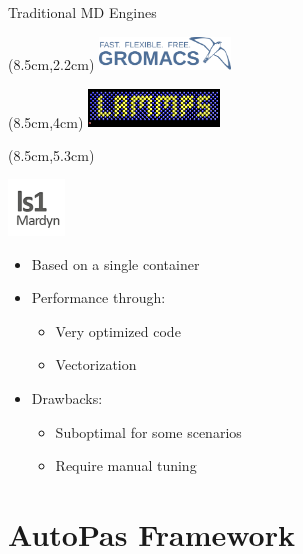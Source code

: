\documentclass[
	10pt,
	t		%
]{beamer}
\begin{document}
\begin{frame}{Traditional MD Engines}


    \begin{textblock*}{3.5cm}(8.5cm,2.2cm)
        \includegraphics[width=3.5cm]{figures/gromacs-logo.png}
    \end{textblock*}
    \begin{textblock*}{3.5cm}(8.5cm,4cm)
        \includegraphics[width=3.5cm]{figures/lammps-logo.png}
    \end{textblock*}
    \begin{textblock*}{3cm}(8.5cm,5.3cm)
        \begin{center}

            \includegraphics[width=1.5cm]{figures/ls1-logo.png}
        \end{center}
    \end{textblock*}


    \begin{itemize}
        \item Based on a single container
        \item Performance through:
              \begin{itemize}
                  \item Very optimized code
                  \item Vectorization
              \end{itemize}
        \item Drawbacks:
              \begin{itemize}
                  \item Suboptimal for some scenarios
                  \item Require manual tuning
              \end{itemize}
    \end{itemize}

\end{frame}

\section{AutoPas Framework}
\end{document}
